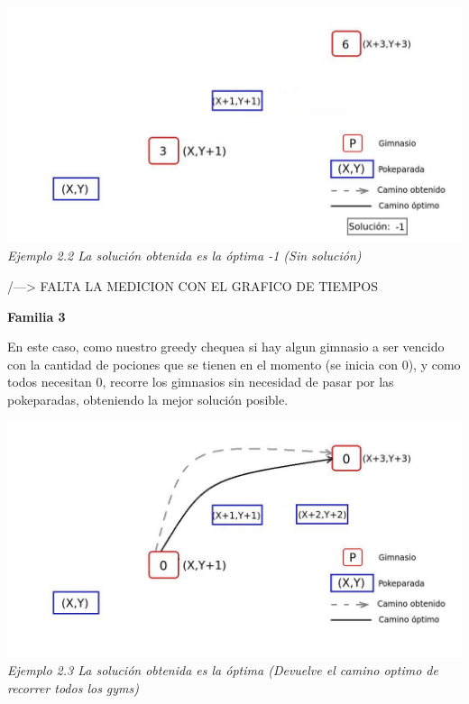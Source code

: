   \vspace*{0.3cm} \vspace*{0.3cm}
  \begin{center}
\includegraphics[scale=0.60]{./EJ2/sinSolucion1.jpeg}
\\{\textit{Ejemplo 2.2 La soluci\'on obtenida es la \'optima -1 (Sin soluci\'on)}}
  \end{center}
  \vspace*{0.3cm}


/---> FALTA LA MEDICION CON EL GRAFICO DE TIEMPOS

\begin{center}
\textbf{Familia 3}
\end{center}

En este caso, como nuestro greedy chequea si hay algun gimnasio a ser vencido con la cantidad de pociones que se tienen en el momento (se inicia con 0), y como todos necesitan 0, recorre los gimnasios sin necesidad de pasar por las pokeparadas, obteniendo la mejor soluci\'on posible.

  \vspace*{0.3cm} \vspace*{0.3cm}
  \begin{center}
\includegraphics[scale=0.60]{./EJ2/gym0.jpeg}
\\{\textit{Ejemplo 2.3 La soluci\'on obtenida es la \'optima (Devuelve el camino optimo de recorrer todos los gyms)}}
  \end{center}
  \vspace*{0.3cm}


